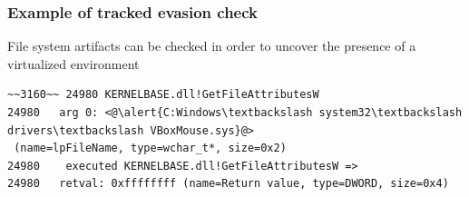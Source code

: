 \documentclass[compress]{beamer}
\begin{document}
\begin{frame}[fragile]
    \frametitle{Example of tracked evasion check}
    
File system artifacts can be checked in order to uncover the presence of a virtualized environment
\vspace*{0.5cm}
    
	
\begin{lstlisting}
~~3160~~ 24980 KERNELBASE.dll!GetFileAttributesW
24980 	arg 0: <@\alert{C:Windows\textbackslash system32\textbackslash drivers\textbackslash VBoxMouse.sys}@>
 (name=lpFileName, type=wchar_t*, size=0x2)
24980    executed KERNELBASE.dll!GetFileAttributesW =>
24980 	retval: 0xffffffff (name=Return value, type=DWORD, size=0x4)
\end{lstlisting}


\end{frame}
\end{document}
